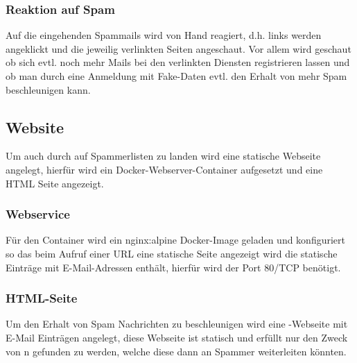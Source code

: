\documentclass[a4paper,11pt,singlespacing]{article}
\begin{document}
		\subsubsection{Reaktion auf Spam}\label{AdressenVerbreitenReaktionSpam}
		Auf die eingehenden Spammails wird von Hand reagiert, d.h. links werden angeklickt und die jeweilig verlinkten Seiten angeschaut. Vor allem wird geschaut ob sich evtl. noch mehr Mails bei den verlinkten Diensten registrieren lassen und ob man durch eine Anmeldung mit Fake-Daten evtl. den Erhalt von mehr Spam beschleunigen kann.
	
	\subsection{Website}\label{sec:UmsetzungWebsite}
		Um auch durch  auf Spammerlisten zu landen wird eine statische Webseite angelegt, hierfür wird ein Docker-Webserver-Container aufgesetzt und eine HTML Seite angezeigt.

		\subsubsection{Webservice}\label{WebsiteWebservice}
			Für den Container wird ein nginx:alpine Docker-Image geladen und konfiguriert so das beim Aufruf einer URL eine statische Seite angezeigt wird die statische Einträge mit E-Mail-Adressen enthält, hierfür wird der Port 80/TCP benötigt.
			
		\subsubsection{HTML-Seite}\label{WebsiteHTML-Seite}
			Um den Erhalt von Spam Nachrichten zu beschleunigen wird eine -Webseite mit E-Mail Einträgen angelegt, diese Webseite ist statisch und erfüllt nur den Zweck von n gefunden zu werden, welche diese dann an Spammer weiterleiten könnten.

\newpage

	
\end{document}
